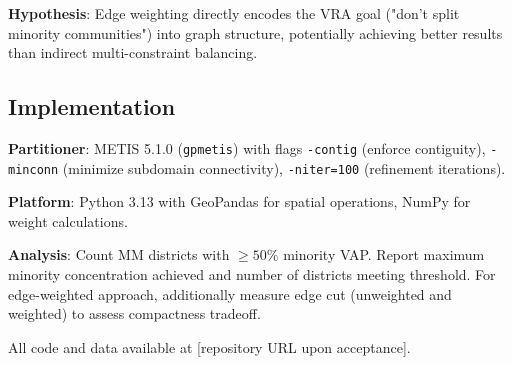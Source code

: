 \textbf{Hypothesis}: Edge weighting directly encodes the VRA goal ("don't split minority communities") into graph structure, potentially achieving better results than indirect multi-constraint balancing.

\subsection{Implementation}

\textbf{Partitioner}: METIS 5.1.0 (\texttt{gpmetis}) with flags \texttt{-contig} (enforce contiguity), \texttt{-minconn} (minimize subdomain connectivity), \texttt{-niter=100} (refinement iterations).

\textbf{Platform}: Python 3.13 with GeoPandas for spatial operations, NumPy for weight calculations.

\textbf{Analysis}: Count MM districts with $\geq 50\%$ minority VAP. Report maximum minority concentration achieved and number of districts meeting threshold. For edge-weighted approach, additionally measure edge cut (unweighted and weighted) to assess compactness tradeoff.

All code and data available at [repository URL upon acceptance].
